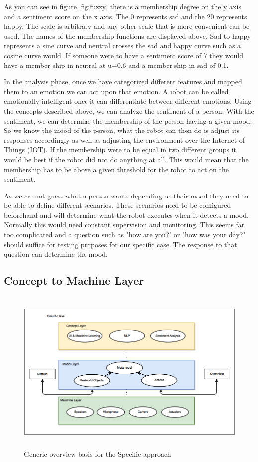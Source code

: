 \documentclass{lncs}
\begin{document}
As you can see in figure \ref{fig:fuzzy} there is a membership degree on the y axis and a sentiment score on the x axis. The 0 represents sad and the 20 represents happy. The scale is arbitrary and any other scale that is more convenient can be used. The names of the membership functions are displayed above. Sad to happy represents a sine curve and neutral crosses the sad and happy curve such as a cosine curve would. If someone were to have a sentiment score of 7 they would have a member ship in neutral at u=0.6 and a member ship in sad of 0.1.

In the analysis phase, once we have categorized different features and mapped them to an emotion we can act upon that emotion. A robot can be called emotionally intelligent once it can differentiate between different emotions. Using the concepts described above, we can analyze the sentiment of a person. With the sentiment, we can determine the membership of the person having a given mood. So we know the mood of the person, what the robot can then do is adjust its responses accordingly as well as adjusting the environment over the Internet of Things (IOT). If the membership were to be equal in two different groups it would be best if the robot did not do anything at all. This would mean that the membership has to be above a given threshold for the robot to act on the sentiment.

As we cannot guess what a person wants depending on their mood they need to be able to define different scenarios. These scenarios need to be configured beforehand and will determine what the robot executes when it detects a mood. Normally this would need constant supervision and monitoring. This seems far too complicated and a question such as "how are you?" or "how was your day?" should suffice for testing purposes for our specific case. The response to that question can determine the mood.

\subsection{Concept to Machine Layer}

\begin{figure}%
\includegraphics[width=\linewidth, height=8cm]{omirob.png}
\caption{Generic overview basis for the Specific approach}
\label{fig:concept-model-maschine}
\end{figure}
\end{document}
